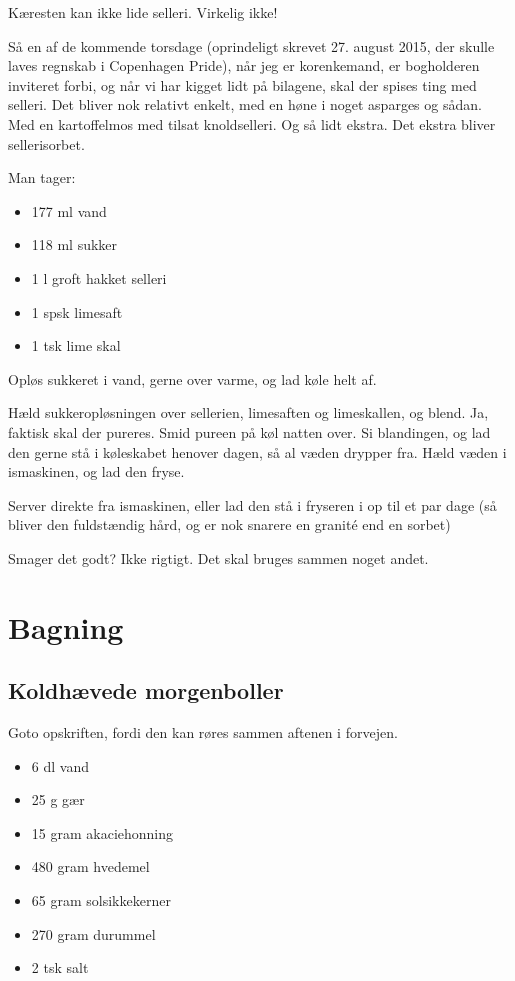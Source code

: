 \documentclass[
  letterpaper,
  DIV=11,
  numbers=noendperiod]{scrreprt}
\providecommand{\tightlist}{%
  \setlength{\itemsep}{0pt}\setlength{\parskip}{0pt}}\usepackage{longtable,booktabs,array}
\begin{document}
Kæresten kan ikke lide selleri. Virkelig ikke!

Så en af de kommende torsdage (oprindeligt skrevet 27. august 2015, der
skulle laves regnskab i Copenhagen Pride), når jeg er korenkemand, er
bogholderen inviteret forbi, og når vi har kigget lidt på bilagene, skal
der spises ting med selleri. Det bliver nok relativt enkelt, med en høne
i noget asparges og sådan. Med en kartoffelmos med tilsat knoldselleri.
Og så lidt ekstra. Det ekstra bliver sellerisorbet.

Man tager:

\begin{itemize}
\tightlist
\item
  177 ml vand
\item
  118 ml sukker
\item
  1 l groft hakket selleri
\item
  1 spsk limesaft
\item
  1 tsk lime skal
\end{itemize}

Opløs sukkeret i vand, gerne over varme, og lad køle helt af.

Hæld sukkeropløsningen over sellerien, limesaften og limeskallen, og
blend. Ja, faktisk skal der pureres. Smid pureen på køl natten over. Si
blandingen, og lad den gerne stå i køleskabet henover dagen, så al væden
drypper fra. Hæld væden i ismaskinen, og lad den fryse.

Server direkte fra ismaskinen, eller lad den stå i fryseren i op til et
par dage (så bliver den fuldstændig hård, og er nok snarere en granité
end en sorbet)

Smager det godt? Ikke rigtigt. Det skal bruges sammen noget andet.


\hypertarget{bagning}{%
\chapter{Bagning}\label{bagning}}

\hypertarget{koldhuxe6vede-morgenboller}{%
\section{Koldhævede morgenboller}\label{koldhuxe6vede-morgenboller}}

Goto opskriften, fordi den kan røres sammen aftenen i forvejen.

\begin{itemize}
\tightlist
\item
  6 dl vand
\item
  25 g gær
\item
  15 gram akaciehonning
\item
  480 gram hvedemel
\item
  65 gram solsikkekerner
\item
  270 gram durummel
\item
  2 tsk salt
\end{itemize}
\end{document}
